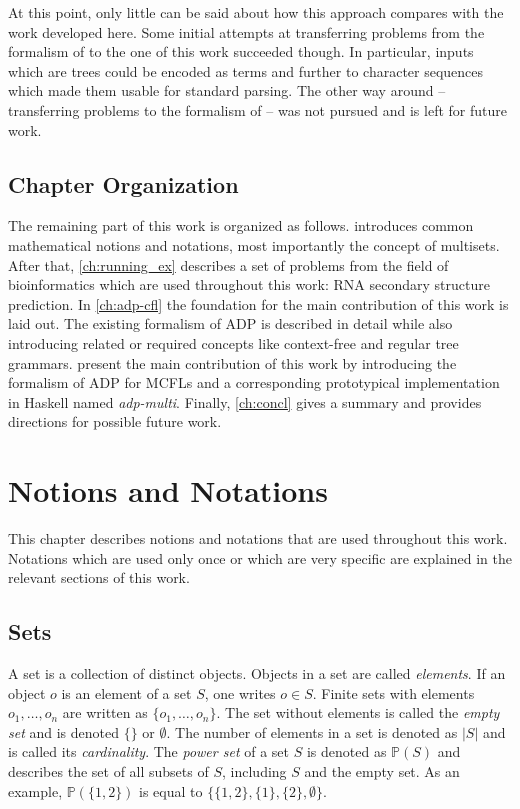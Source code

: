 \documentclass[
    a4paper,
    12pt,
    twoside,
    BCOR=12mm,
    parskip=half,
    chapterprefix,
    numbers=noenddot,
    bibliography=totoc
]{scrbook}
\begin{document}
At this point, only little can be said about how this approach compares with the work developed here. Some initial attempts at transferring problems from the formalism of \citeauthor{giegerich_modeling_2013} to the one of this work succeeded though. In particular, inputs which are trees could be encoded as terms and further to character sequences which made them usable for standard parsing. The other way around -- transferring problems to the formalism of \citeauthor{giegerich_modeling_2013} -- was not pursued and is left for future work.

\section{Chapter Organization}

The remaining part of this work is organized as follows.  introduces common mathematical notions and notations, most importantly the concept of multisets. After that, \cref{ch:running_ex} describes a set of problems from the field of bioinformatics which are used throughout this work: RNA secondary structure prediction. In \cref{ch:adp-cfl} the foundation for the main contribution of this work is laid out. The existing formalism of \gls{ADP} is described in detail while also introducing related or required concepts like context-free and regular tree grammars.  present the main contribution of this work by introducing the formalism of \gls{ADP} for \glspl{MCFL} and a corresponding prototypical implementation in Haskell named \emph{adp-multi}. Finally, \cref{ch:concl} gives a summary and provides directions for possible future work.


\chapter{Notions and Notations}
\label{ch:notion_notation}

This chapter describes notions and notations that are used throughout this work. Notations which are used only once or which are very specific are explained in the relevant sections of this work.

\section{Sets}

A set is a collection of distinct objects. Objects in a set are called \emph{elements}. If an object $o$ is an element of a set $S$, one writes $o \in S$. Finite sets with elements $o_1,\ldots,o_n$ are written as $\{o_1,\ldots,o_n\}$. The set without elements is called the \emph{empty set} and is denoted $\{\}$ or $\emptyset$. The number of elements in a set is denoted as $|S|$ and is called its \emph{cardinality}. The \emph{power set} of a set $S$ is denoted as $\mathbb{P}(S)$ and describes the set of all subsets of $S$, including $S$ and the empty set. As an example, $\mathbb{P}(\{1,2\})$ is equal to $\{\{1,2\},\{1\},\{2\},\emptyset\}$.
\end{document}
